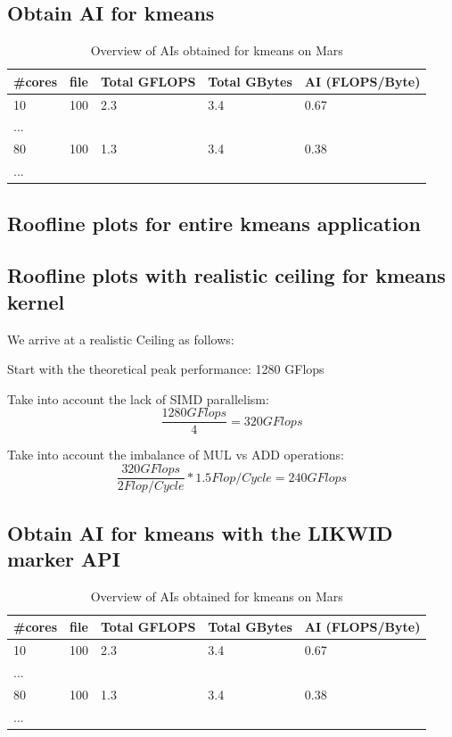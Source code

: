 \subsection{Obtain AI for kmeans}

\begin{table}[h]
\centering
\caption{\label{tab:ai_tab}Overview of AIs obtained for kmeans on Mars}
\begin{small}
\begin{tabular}{lllll}
\toprule
\#cores & file & Total GFLOPS & Total GBytes & AI (FLOPS/Byte) \\
\midrule
10 & 100 & 2.3 & 3.4 & 0.67 \\
...\\
80 & 100 & 1.3 & 3.4 & 0.38 \\
...\\
\bottomrule
\end{tabular}
\end{small}
\end{table}

\subsection{Roofline plots for entire kmeans application}

\subsection{Roofline plots with realistic ceiling for kmeans kernel}

We arrive at a realistic Ceiling as follows:

Start with the theoretical peak performance: 1280 GFlops

Take into account the lack of SIMD parallelism: 
$$\frac{1280 GFlops}{4} = 320 GFlops$$

Take into account the imbalance of MUL vs ADD operations:
$$\frac{320 GFlops}{2 Flop/Cycle} *1.5 Flop/Cycle = 240 GFlops$$

\subsection{Obtain AI for kmeans with the LIKWID marker API}

\begin{table}[h]
\centering
\caption{\label{tab:ai_tab}Overview of AIs obtained for kmeans on Mars}
\begin{small}
\begin{tabular}{lllll}
\toprule
\#cores & file & Total GFLOPS & Total GBytes & AI (FLOPS/Byte) \\
\midrule
10 & 100 & 2.3 & 3.4 & 0.67 \\
...\\
80 & 100 & 1.3 & 3.4 & 0.38 \\
...\\
\bottomrule
\end{tabular}
\end{small}
\end{table}


